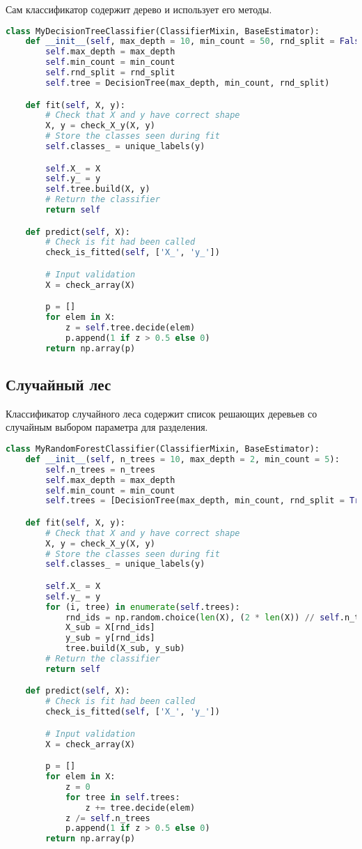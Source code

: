 Сам классификатор содержит дерево и использует его методы.
\begin{lstlisting}[language=Python]
class MyDecisionTreeClassifier(ClassifierMixin, BaseEstimator):
    def __init__(self, max_depth = 10, min_count = 50, rnd_split = False):
        self.max_depth = max_depth
        self.min_count = min_count
        self.rnd_split = rnd_split
        self.tree = DecisionTree(max_depth, min_count, rnd_split)

    def fit(self, X, y):
        # Check that X and y have correct shape
        X, y = check_X_y(X, y)
        # Store the classes seen during fit
        self.classes_ = unique_labels(y)

        self.X_ = X
        self.y_ = y
        self.tree.build(X, y)
        # Return the classifier
        return self

    def predict(self, X):
        # Check is fit had been called
        check_is_fitted(self, ['X_', 'y_'])

        # Input validation
        X = check_array(X)

        p = []
        for elem in X:
            z = self.tree.decide(elem)
            p.append(1 if z > 0.5 else 0)
        return np.array(p)
\end{lstlisting}
\pagebreak

\subsection{Случайный лес}

Классификатор случайного леса содержит список решающих деревьев со случайным выбором параметра для разделения.
\begin{lstlisting}[language=Python]
class MyRandomForestClassifier(ClassifierMixin, BaseEstimator):
    def __init__(self, n_trees = 10, max_depth = 2, min_count = 5):
        self.n_trees = n_trees
        self.max_depth = max_depth
        self.min_count = min_count
        self.trees = [DecisionTree(max_depth, min_count, rnd_split = True) for _ in range(self.n_trees)]

    def fit(self, X, y):
        # Check that X and y have correct shape
        X, y = check_X_y(X, y)
        # Store the classes seen during fit
        self.classes_ = unique_labels(y)

        self.X_ = X
        self.y_ = y
        for (i, tree) in enumerate(self.trees):
            rnd_ids = np.random.choice(len(X), (2 * len(X)) // self.n_trees)
            X_sub = X[rnd_ids]
            y_sub = y[rnd_ids]
            tree.build(X_sub, y_sub)
        # Return the classifier
        return self

    def predict(self, X):
        # Check is fit had been called
        check_is_fitted(self, ['X_', 'y_'])

        # Input validation
        X = check_array(X)

        p = []
        for elem in X:
            z = 0
            for tree in self.trees:
                z += tree.decide(elem)
            z /= self.n_trees
            p.append(1 if z > 0.5 else 0)
        return np.array(p)
\end{lstlisting}
\pagebreak

